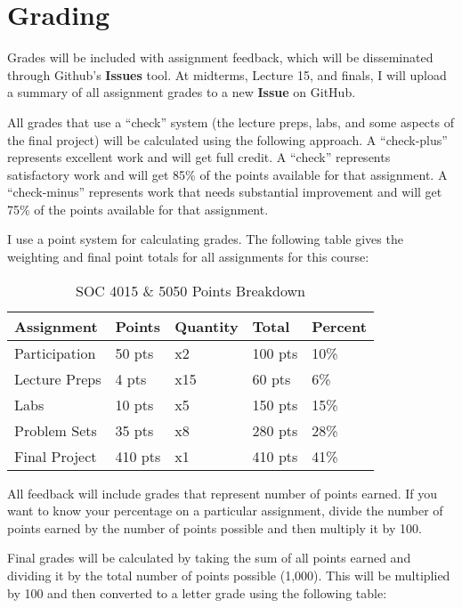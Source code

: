 \documentclass[]{book}
\theoremstyle{definition}
\theoremstyle{definition}
\theoremstyle{definition}
\theoremstyle{remark}
\begin{document}
\section{Grading}\label{grading}

Grades will be included with assignment feedback, which will be
disseminated through Github's \textbf{Issues} tool. At midterms, Lecture
15, and finals, I will upload a summary of all assignment grades to a
new \textbf{Issue} on GitHub.

All grades that use a ``check'' system (the lecture preps, labs, and
some aspects of the final project) will be calculated using the
following approach. A ``check-plus'' represents excellent work and will
get full credit. A ``check'' represents satisfactory work and will get
85\% of the points available for that assignment. A ``check-minus''
represents work that needs substantial improvement and will get 75\% of
the points available for that assignment.

I use a point system for calculating grades. The following table gives
the weighting and final point totals for all assignments for this
course:

\begin{table}

\caption{\label{tab:unnamed-chunk-8}SOC 4015 & 5050 Points Breakdown}
\centering
\begin{tabular}[t]{lllll}
\toprule
Assignment & Points & Quantity & Total & Percent\\
\midrule
Participation & 50 pts & x2 & 100 pts & 10\%\\
Lecture Preps & 4 pts & x15 & 60 pts & 6\%\\
Labs & 10 pts & x5 & 150 pts & 15\%\\
Problem Sets & 35 pts & x8 & 280 pts & 28\%\\
Final Project & 410 pts & x1 & 410 pts & 41\%\\
\bottomrule
\end{tabular}
\end{table}

All feedback will include grades that represent number of points earned.
If you want to know your percentage on a particular assignment, divide
the number of points earned by the number of points possible and then
multiply it by 100.

Final grades will be calculated by taking the sum of all points earned
and dividing it by the total number of points possible (1,000). This
will be multiplied by 100 and then converted to a letter grade using the
following table:
\end{document}
